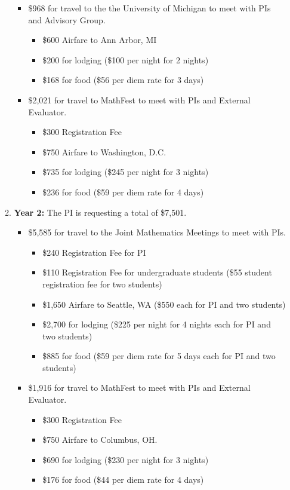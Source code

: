 \documentclass[11pt]{article}
\begin{document}
\begin{enumerate}[leftmargin=*]
\begin{enumerate}
\begin{itemize}
\item \$968 for travel to the the University of Michigan to meet with PIs and Advisory Group.
\begin{itemize}
\item \$600 Airfare to Ann Arbor, MI
\item \$200 for lodging (\$100 per night for 2 nights)
\item \$168 for food (\$56 per diem rate for 3 days)
\end{itemize}

\item \$2,021 for travel to MathFest to meet with PIs and External Evaluator.
\begin{itemize}
\item \$300 Registration Fee
\item \$750 Airfare to Washington, D.C.
\item \$735 for lodging (\$245 per night for 3 nights)
\item \$236 for food (\$59 per diem rate for 4 days)
\end{itemize}
\end{itemize}

\item[] \textbf{Year 2:} The PI is requesting a total of \$7,501.
\begin{itemize}
\item \$5,585 for travel to the Joint Mathematics Meetings to meet with PIs.
\begin{itemize}
\item \$240 Registration Fee for PI
\item \$110 Registration Fee for undergraduate students (\$55 student registration fee for two students)
\item \$1,650 Airfare to Seattle, WA (\$550 each for PI and two students)
\item \$2,700 for lodging (\$225 per night for 4 nights each for PI and two students)
\item \$885 for food (\$59 per diem rate for 5 days each for PI and two students)
\end{itemize}

\item \$1,916 for travel to MathFest to meet with PIs and External Evaluator.
\begin{itemize}
\item \$300 Registration Fee
\item \$750 Airfare to Columbus, OH.
\item \$690 for lodging (\$230 per night for 3 nights)
\item \$176 for food (\$44 per diem rate for 4 days)
\end{itemize}
\end{itemize}


\end{enumerate}
\end{enumerate}
\end{document}
